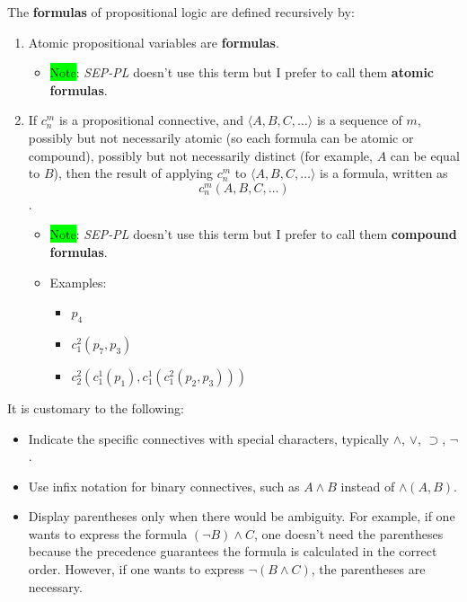 \documentclass[12pt, letterpaper]{article}
\begin{document}
The \textbf{formulas} of propositional logic are defined recursively by:
\begin{enumerate}
  \item Atomic propositional variables are \textbf{formulas}.
  \begin{itemize}
    \item \colorbox{lime}{Note}: \textit{SEP-PL} doesn't use this term but I prefer
    to call them \textbf{atomic formulas}.
  \end{itemize}

  \item If $c_n^m$ is a propositional connective, and $\langle A, B, C, \ldots
    \rangle$ is a sequence of $m$, possibly but not necessarily atomic (so each
    formula can be atomic or compound), possibly but not necessarily distinct
    (for example, $A$ can be equal to $B$), then the result of applying $c_n^m$
    to $\langle A, B, C, \ldots \rangle$ is a formula, written as \[c_n^m(A, B,
    C, \ldots)\].
    \begin{itemize}
      \item \colorbox{lime}{Note}: \textit{SEP-PL} doesn't use this term but I
        prefer to call them \textbf{compound formulas}.
      \item Examples:
      \begin{itemize}
        \item $p_4$
        \item $c_1^2(p_7, p_3)$
        \item $c_2^2(c_1^1(p_1), c_1^1(c_1^2(p_2, p_3)))$
      \end{itemize}
    \end{itemize}
\end{enumerate}

It is customary to the following:
\begin{itemize}
  \item Indicate the specific connectives with special characters, typically
    $\land$, $\lor$, $\supset$, $\lnot$.
  \item Use infix notation for binary connectives, such as $A \land B$ instead
    of $\land(A, B)$.
  \item Display parentheses only when there would be ambiguity. For example,
    if one wants to express the formula $(\lnot B) \land C$, one doesn't need
    the parentheses because the precedence guarantees the formula is calculated
    in the correct order. However, if one wants to express $\lnot (B \land C)$,
    the parentheses are necessary.
\end{itemize}
\end{document}
